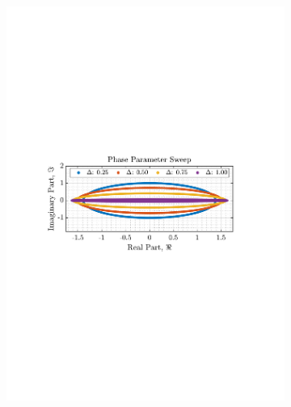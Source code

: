 \documentclass[12pt]{article}
\numberwithin{equation}{section}
\begin{document}
\begin{figure}[H]
				\begin{subfigure}{0.49\textwidth}
					\centering
					\includegraphics[trim={2.2cm 11.2cm 3.00cm  11.2cm}, clip, width=\textwidth]{../MATLAB/figures/q3_1c_fig03.pdf} 
					\captionsetup{justification=centering}
				\end{subfigure}
				\begin{subfigure}{0.49\textwidth}
					\centering

\end{subfigure}
\end{figure}
\end{document}
